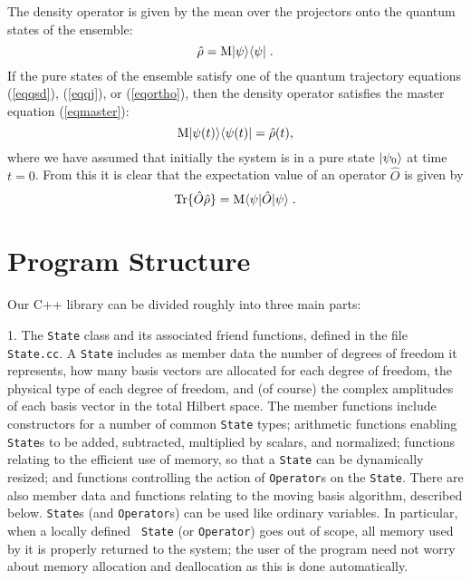 The density operator is given by the
mean over the projectors onto the quantum states of the ensemble:
\begin{equation}
\hat\rho = {\rm M}|\psi\rangle\langle\psi| \;.
\end{equation}
If the pure states of the ensemble satisfy one of the quantum trajectory
equations (\ref{eqqsd}), (\ref{eqqj}), or (\ref{eqortho}), then
the density operator satisfies the master equation (\ref{eqmaster}):
\begin{equation}
{\rm M}| \psi(t) \rangle \langle \psi(t) | = \hat\rho(t),
\end{equation}
where we have assumed that initially the system is in a pure state
$| \psi_0 \rangle$ at time $t=0$.  From this it is clear that the expectation
value of an operator $\hat O$ is given by
\begin{equation}
{\rm Tr}\{\hat O\hat\rho \} = {\rm M} \langle \psi |\hat O | \psi \rangle  \;.
\end{equation}


\section{Program Structure}

Our C++ library can be divided roughly into three main parts:

1.  The {\tt State} class and its associated friend functions, defined in the
file {\tt State.cc}.  A {\tt State}
includes as member data the number of degrees of freedom it represents, how
many basis vectors are allocated for each degree of freedom, the physical type
of each degree of freedom, and (of course) the complex amplitudes of each basis
vector in the total Hilbert space.  The member functions include constructors
for a number of common {\tt State} types; arithmetic functions enabling {\tt
State}s to be added, subtracted, multiplied by scalars, and normalized;
functions relating to the efficient use of memory, so that a {\tt State} can be
dynamically resized; and functions controlling the action of {\tt Operator}s on
the {\tt State}.  There are also member data and functions relating to the
moving basis algorithm, described below. {\tt State}s (and {\tt Operator}s) can
be used like ordinary variables. In particular, when a locally defined {\tt
State} (or {\tt Operator}) goes out of scope, all memory used by it is properly
returned to the system; the user of the program need not worry about memory
allocation and deallocation as this is done automatically.

